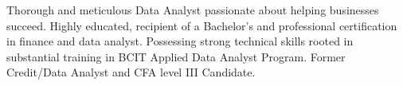 

\begin{cvparagraph}

Thorough and meticulous Data Analyst passionate about helping businesses succeed.
Highly educated, recipient of a Bachelor's and professional certification in finance and data analyst. 
Possessing strong technical skills rooted in substantial training in BCIT Applied Data Analyst Program.
Former Credit/Data Analyst and CFA level III Candidate.
\end{cvparagraph}
